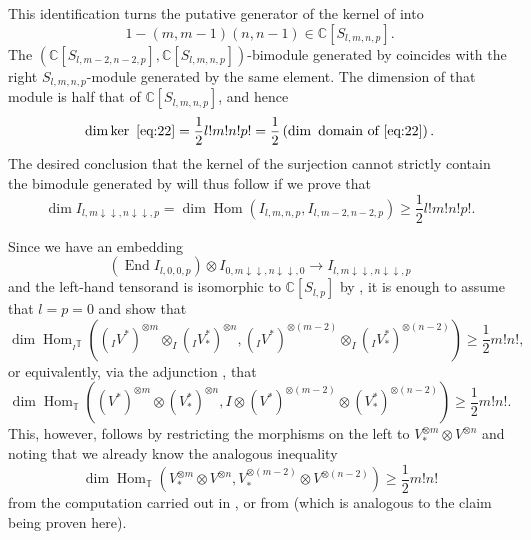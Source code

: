 \documentclass[11pt]{article}
\theoremstyle{plain}
\theoremstyle{nonumberplain}
\theoremstyle{plain}
\numberwithin{equation}{section}
\theoremstyle{nonumberplain}
\newcommand\bC{{\mathbb C}}
\newcommand\bT{{\mathbb T}}
\newcommand\1{{\bf 1}}
\DeclareMathOperator{\End}{\mathrm{End}}
\DeclareMathOperator{\Hom}{\mathrm{Hom}}
\begin{document}
\begin{th:sl-univ}[sketch]
  This identification turns the putative generator  of the kernel of  into
  \begin{equation}\label{eq:elem}
    1-(m,m-1)(n,n-1)\in \bC [S_{l,m,n,p}].
  \end{equation}
  The $(\bC[S_{l,m-2,n-2,p}],\bC[S_{l,m,n,p}])$-bimodule generated by  coincides with the right $S_{l,m,n,p}$-module generated by the same element. The dimension of that module is half that of $\bC [S_{l,m,n,p}]$, and hence
  \begin{equation*}
    \dim \ker ~\text{\Cref{eq:22}} = \frac 12 l!m!n!p! = \frac 12 \left(\dim~\text{domain of \Cref{eq:22}}\right).
  \end{equation*}
  The desired conclusion that the kernel of the surjection  cannot strictly contain the bimodule generated by  will thus follow if we prove that
  \begin{equation*}
    \dim I_{l,m\downarrow\downarrow,n\downarrow\downarrow,p} = \dim \Hom(I_{l,m,n,p},I_{l,m-2,n-2,p})\ge \frac 12 l!m!n!p!{.}
  \end{equation*}

  Since we have an embedding
  \begin{equation*}
    (\End I_{l,0,0,p})\otimes I_{0,m\downarrow\downarrow,n\downarrow\downarrow,0}\to I_{l,m\downarrow\downarrow,n\downarrow\downarrow,p}
  \end{equation*}
  and the left-hand tensorand is isomorphic to $\bC [S_{l,p}]$ by , it is enough to assume that $l=p=0$ and show that
  \begin{equation*}
    \dim \Hom_{{}_I\bT}\left(({}_IV^*)^{\otimes m}\otimes_I ({}_IV_*^*)^{\otimes n}, ({}_IV^*)^{\otimes (m-2)}\otimes_I ({}_IV_*^*)^{\otimes (n-2)}\right)
    \ge
    \frac 12 m! n!,
  \end{equation*}
  or equivalently, via the adjunction , that 
    \begin{equation*}
    \dim \Hom_{\bT}\left((V^*)^{\otimes m}\otimes (V_*^*)^{\otimes n}, I\otimes (V^*)^{\otimes (m-2)}\otimes (V_*^*)^{\otimes (n-2)}\right)
    \ge
    \frac 12 m! n!.
  \end{equation*}  
  This, however, follows by restricting the morphisms on the left to $V_*^{\otimes m}\otimes V^{\otimes n}$ and noting that we already know the analogous inequality
  \begin{equation*}
    \dim \Hom_{\bT}\left(V_*^{\otimes m}\otimes V^{\otimes n}, V_*^{\otimes (m-2)}\otimes V^{\otimes (n-2)}\right)
    \ge
    \frac 12 m! n!
  \end{equation*}
  from the computation carried out in \cite[Lemma 6.3]{DPS}, or from \cite[Lemma 3.27 (a)]{us0} (which is analogous to the claim being proven here).
\end{th:sl-univ}
\end{document}
